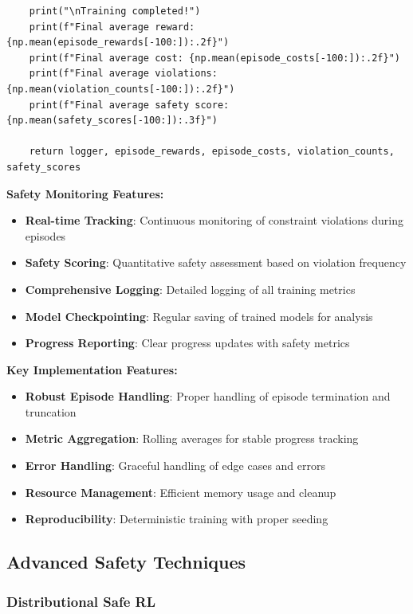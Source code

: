 \documentclass[12pt]{article}
\begin{document}
{{{{\begin{verbatim}
    print("\nTraining completed!")
    print(f"Final average reward: {np.mean(episode_rewards[-100:]):.2f}")
    print(f"Final average cost: {np.mean(episode_costs[-100:]):.2f}")
    print(f"Final average violations: {np.mean(violation_counts[-100:]):.2f}")
    print(f"Final average safety score: {np.mean(safety_scores[-100:]):.3f}")
    
    return logger, episode_rewards, episode_costs, violation_counts, safety_scores
\end{verbatim}

\textbf{Safety Monitoring Features:}
\begin{itemize}
\item \textbf{Real-time Tracking}: Continuous monitoring of constraint violations during episodes
\item \textbf{Safety Scoring}: Quantitative safety assessment based on violation frequency
\item \textbf{Comprehensive Logging}: Detailed logging of all training metrics
\item \textbf{Model Checkpointing}: Regular saving of trained models for analysis
\item \textbf{Progress Reporting}: Clear progress updates with safety metrics
\end{itemize}

\textbf{Key Implementation Features:}
\begin{itemize}
\item \textbf{Robust Episode Handling}: Proper handling of episode termination and truncation
\item \textbf{Metric Aggregation}: Rolling averages for stable progress tracking
\item \textbf{Error Handling}: Graceful handling of edge cases and errors
\item \textbf{Resource Management}: Efficient memory usage and cleanup
\item \textbf{Reproducibility}: Deterministic training with proper seeding
\end{itemize}

\subsection{Advanced Safety Techniques}

\subsubsection{Distributional Safe RL}

}}}}
\end{document}
